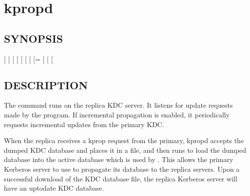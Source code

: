 \documentclass[letterpaper,10pt,english]{sphinxmanual}
\begin{document}
\section{kpropd}
\label{\detokenize{admin/admin_commands/kpropd:kpropd}}\label{\detokenize{admin/admin_commands/kpropd:kpropd-8}}\label{\detokenize{admin/admin_commands/kpropd::doc}}

\subsection{SYNOPSIS}
\label{\detokenize{admin/admin_commands/kpropd:synopsis}}
\sphinxAtStartPar
{}
{[} \sphinxstyleemphasis{realm}{]}
{[} \sphinxstyleemphasis{admin\_server}{]}
{[} \sphinxstyleemphasis{acl\_file}{]}
{[} \sphinxstyleemphasis{replica\_dumpfile}{]}
{[} \sphinxstyleemphasis{principal\_database}{]}
{[} \sphinxstyleemphasis{kdb5\_util\_prog}{]}
{[} \sphinxstyleemphasis{port}{]}
{[}=\sphinxstyleemphasis{pid\_file}{]}
{[}\sphinxstylestrong{\sphinxhyphen{}D}{]}
{[}\sphinxstylestrong{\sphinxhyphen{}d}{]}
{[} \sphinxstyleemphasis{keytab\_file}{]}


\subsection{DESCRIPTION}
\label{\detokenize{admin/admin_commands/kpropd:description}}
\sphinxAtStartPar
The  command runs on the replica KDC server.  It listens for
update requests made by the {\hyperref[\detokenize{admin/admin_commands/kprop:kprop-8}]{}} program.  If incremental
propagation is enabled, it periodically requests incremental updates
from the primary KDC.

\sphinxAtStartPar
When the replica receives a kprop request from the primary, kpropd
accepts the dumped KDC database and places it in a file, and then runs
{\hyperref[\detokenize{admin/admin_commands/kdb5_util:kdb5-util-8}]{}} to load the dumped database into the active
database which is used by {\hyperref[\detokenize{admin/admin_commands/krb5kdc:krb5kdc-8}]{}}.  This allows the primary
Kerberos server to use {\hyperref[\detokenize{admin/admin_commands/kprop:kprop-8}]{}} to propagate its database to
the replica servers.  Upon a successful download of the KDC database
file, the replica Kerberos server will have an up\sphinxhyphen{}to\sphinxhyphen{}date KDC
database.
\end{document}

